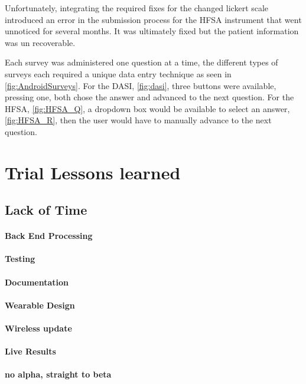 Unfortunately, integrating the required fixes for the changed lickert scale introduced an error in the submission process for the HFSA instrument that went unnoticed for several months. It was ultimately fixed but the patient information was un recoverable.

Each survey was administered one question at a time, the different types of surveys each required a unique data entry technique as seen in \cref{fig:AndroidSurveys}. For the DASI, \cref{fig:dasi}, three buttons were available, pressing one, both chose the answer and advanced to the next question. For the HFSA, \cref{fig:HFSA_Q}, a dropdown box would be available to select an answer, \cref{fig:HFSA_R}, then the user would have to manually advance to the next question. 



\section{Trial Lessons learned}

\subsection{Lack of Time}
\paragraph{Back End Processing}
\paragraph{Testing}
\paragraph{Documentation}
\paragraph{Wearable Design}
\paragraph{Wireless update}
\paragraph{Live Results}
\paragraph{no alpha, straight to beta}


